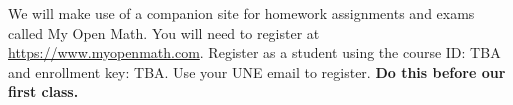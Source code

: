 We will make use of a companion site for homework assignments and exams called My Open Math. You will need to register at \url{https://www.myopenmath.com}. Register as a student using the 
course ID: TBA and enrollment key: TBA. Use your UNE email to register. {\bf Do this before our first class.}